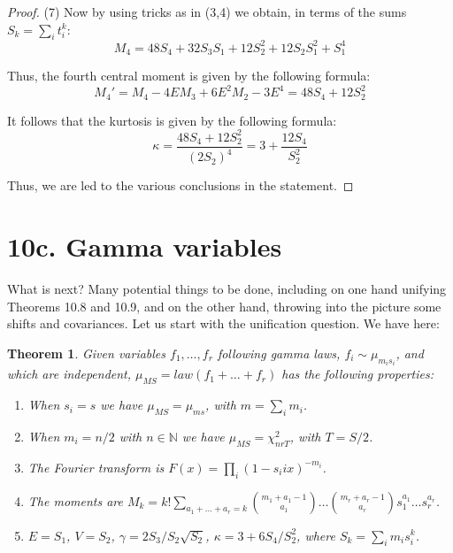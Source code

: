 \documentclass[12pt]{amsbook}
\newtheorem{theorem}{Theorem}[chapter]
\begin{document}
\begin{proof}
(7) Now by using tricks as in (3,4) we obtain, in terms of the sums $S_k=\sum_it_i^k$:
$$M_4=48S_4+32S_3S_1+12S_2^2+12S_2S_1^2+S_1^4$$

Thus, the fourth central moment is given by the following formula:
$$M_4'
=M_4-4EM_3+6E^2M_2-3E^4
=48S_4+12S_2^2$$ 

It follows that the kurtosis is given by the following formula:
$$\kappa=\frac{48S_4+12S_2^2}{(2S_2)^4}=3+\frac{12S_4}{S_2^2}$$

Thus, we are led to the various conclusions in the statement.
\end{proof}

\section*{10c. Gamma variables}

What is next? Many potential things to be done, including on one hand unifying Theorems 10.8 and 10.9, and on the other hand, throwing into the picture some shifts and covariances. Let us start with the unification question. We have here:


\begin{theorem}
Given variables $f_1,\ldots,f_r$ following gamma laws, $f_i\sim \mu_{m_is_i}$, and which are independent, $\mu_{MS}=law(f_1+\ldots+f_r)$ has the following properties:
\begin{enumerate}
\item When $s_i=s$ we have $\mu_{MS}=\mu_{ms}$, with $m=\sum_im_i$.

\item When $m_i=n/2$ with $n\in\mathbb N$ we have $\mu_{MS}=\chi_{nrT}^2$, with $T=S/2$.

\item The Fourier transform is $F(x)=\prod_i(1-s_iix)^{-m_i}$.

\item The moments are $M_k=k!\sum_{a_1+\ldots+a_r=k}\binom{m_1+a_1-1}{a_1}\ldots\binom{m_r+a_r-1}{a_r}s_1^{a_1}\ldots s_r^{a_r}$.

\item $E=S_1$, $V=S_2$, $\gamma=2S_3/S_2\sqrt{S_2}$, $\kappa=3+6S_4/S_2^2$, where $S_k=\sum_im_is_i^k$.
\end{enumerate} 
\end{theorem}
\end{document}
